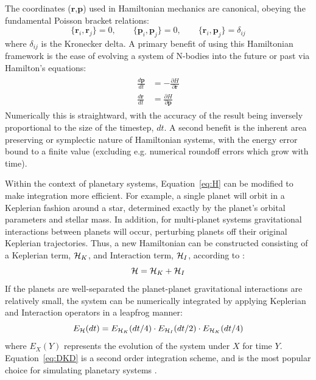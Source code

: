The coordinates ($\textbf{r}$,$\textbf{p}$) used in Hamiltonian mechanics are canonical, obeying the fundamental Poisson bracket relations:
\begin{equation}
\{\textbf{r}_i, \textbf{r}_j\} = 0, \qquad
\{\textbf{p}_i, \textbf{p}_j\} = 0, \qquad
\{\textbf{r}_i, \textbf{p}_j\} = \delta_{ij}
\end{equation}
where $\delta_{ij}$ is the Kronecker delta. 
A primary benefit of using this Hamiltonian framework is the ease of evolving a system of N-bodies into the future or past via Hamilton's equations:
\begin{align}
\begin{split}
\frac{d\textbf{p}}{dt} &= -\frac{\partial H}{\partial \textbf{r}} \\
\frac{d\textbf{r}}{dt} &= \frac{\partial H}{\partial \textbf{p}} 
\label{eq:Heq}
\end{split}
\end{align}
Numerically this is straightward, with the accuracy of the result being inversely proportional to the size of the timestep, $dt$.
A second benefit is the inherent area preserving or symplectic nature of Hamiltonian systems, with the energy error bound to a finite value (excluding e.g. numerical roundoff errors which grow with time).

Within the context of planetary systems, Equation~\ref{eq:H} can be modified to make integration more efficient.
For example, a single planet will orbit in a Keplerian fashion around a star, determined exactly by the planet's orbital parameters and stellar mass. 
In addition, for multi-planet systems gravitational interactions between planets will occur, perturbing planets off their original Keplerian trajectories.
Thus, a new Hamiltonian can be constructed consisting of a Keplerian term, $\mathcal{H}_K$, and Interaction term, $\mathcal{H}_I$, according to \citep{Wisdom1991}:
\begin{equation*}
\mathcal{H} = \mathcal{H}_K + \mathcal{H}_I
\end{equation*}
If the planets are well-separated the planet-planet gravitational interactions are relatively small, the system can be numerically integrated by applying Keplerian and Interaction operators in a leapfrog manner:
\begin{equation}
E_{\mathcal{H}}(dt) = E_{\mathcal{H}_K}(dt/4) \cdot E_{\mathcal{H}_I}(dt/2) \cdot E_{\mathcal{H}_K}(dt/4)
\label{eq:DKD}
\end{equation}
where $E_{X}(Y)$ represents the evolution of the system under $X$ for time $Y$.
Equation~\ref{eq:DKD} is a second order integration scheme, and is the most popular choice for simulating planetary systems \citep{Wisdom1991}.

